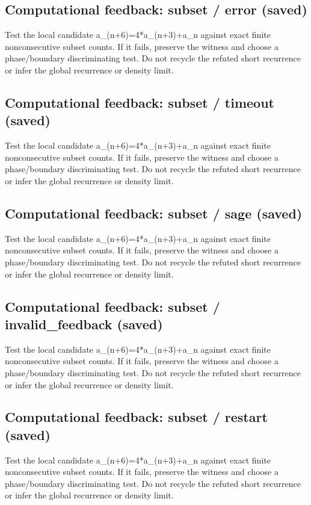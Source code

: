 \documentclass[11pt]{article}
\begin{document}
\subsection{Computational feedback: subset / error (saved)}
Test the local candidate a\_(n+6)=4*a\_(n+3)+a\_n against exact finite nonconsecutive subset counts. If it fails, preserve the witness and choose a phase/boundary discriminating test. Do not recycle the refuted short recurrence or infer the global recurrence or density limit.\par
\subsection{Computational feedback: subset / timeout (saved)}
Test the local candidate a\_(n+6)=4*a\_(n+3)+a\_n against exact finite nonconsecutive subset counts. If it fails, preserve the witness and choose a phase/boundary discriminating test. Do not recycle the refuted short recurrence or infer the global recurrence or density limit.\par
\subsection{Computational feedback: subset / sage (saved)}
Test the local candidate a\_(n+6)=4*a\_(n+3)+a\_n against exact finite nonconsecutive subset counts. If it fails, preserve the witness and choose a phase/boundary discriminating test. Do not recycle the refuted short recurrence or infer the global recurrence or density limit.\par
\subsection{Computational feedback: subset / invalid\_feedback (saved)}
Test the local candidate a\_(n+6)=4*a\_(n+3)+a\_n against exact finite nonconsecutive subset counts. If it fails, preserve the witness and choose a phase/boundary discriminating test. Do not recycle the refuted short recurrence or infer the global recurrence or density limit.\par
\subsection{Computational feedback: subset / restart (saved)}
Test the local candidate a\_(n+6)=4*a\_(n+3)+a\_n against exact finite nonconsecutive subset counts. If it fails, preserve the witness and choose a phase/boundary discriminating test. Do not recycle the refuted short recurrence or infer the global recurrence or density limit.\par
\end{document}
